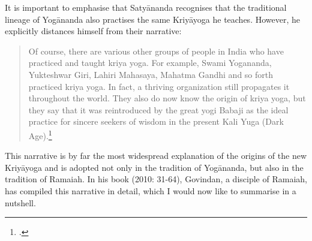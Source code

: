 It is important to emphasise that Satyānanda recognises that the traditional lineage of Yogānanda also practises the same Kriyāyoga he teaches. However, he explicitly distances himself from their narrative: \begin{quote} Of course, there are various other groups of people in India who have practiced and taught kriya yoga. For example, Swami Yogananda, Yukteshwar Giri, Lahiri Mahasaya, Mahatma Gandhi and so forth practiced kriya yoga. In fact, a thriving organization still propagates it throughout the world. They also do now know the origin of kriya yoga, but they say that it was reintroduced by the great yogi Babaji as the ideal practice for sincere seekers of wisdom in the present Kali Yuga (Dark Age).\footnote{\citeauthor[1981: 699]{kriyayogasarasvati1981}.}\end{quote}

This narrative is by far the most widespread explanation of the origins of the new Kriyāyoga and is adopted not only in the tradition of Yogānanda, but also in the tradition of Ramaiah. In his book  (2010: 31-64), Govindan, a disciple of Ramaiah, has compiled this narrative in detail, which I would now like to summarise in a nutshell.

